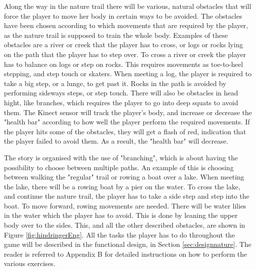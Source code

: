 Along the way in the nature trail there will be various, natural obstacles that will force the player to move her body in certain ways to be avoided. The obstacles have been chosen according to which movements that are required by the player, as the nature trail is supposed to train the whole body. Examples of these obstacles are a river or creek that the player has to cross, or logs or rocks lying on the path that the player has to step over. To cross a river or creek the player has to balance on logs or step on rocks. This requires movements as toe-to-heel stepping, and step touch or skaters. When meeting a log, the player is required to take a big step, or a lunge, to get past it. Rocks in the path is avoided by performing sideways steps, or step touch. There will also be obstacles in head hight, like branches, which requires the player to go into deep squats to avoid them. The Kinect sensor will track the player's body, and increase or decrease the "health bar" according to how well the player perform the required movements. If the player hits some of the obstacles, they will get a flash of red, indication that the player failed to avoid them. As a result, the "health bar" will decrease.

The story is organised with the use of "branching", which is about having the possibility to choose between multiple paths. An example of this is choosing between walking the "regular" trail or rowing a boat over a lake. When meeting the lake, there will be a rowing boat by a pier on the water. To cross the lake, and continue the nature trail, the player has to take a side step and step into the boat. To move forward, rowing movements are needed. There will be water lilies in the water which the player has to avoid. This is done by leaning the upper body over to the sides. This, and all the other described obstacles, are shown in Figure \ref{fig:hindringerEng}. All the tasks the player has to do throughout the game will be described in the functional design, in Section \ref{sec:designnature}. The reader is referred to Appendix B for detailed instructions on how to perform the various exercises.

